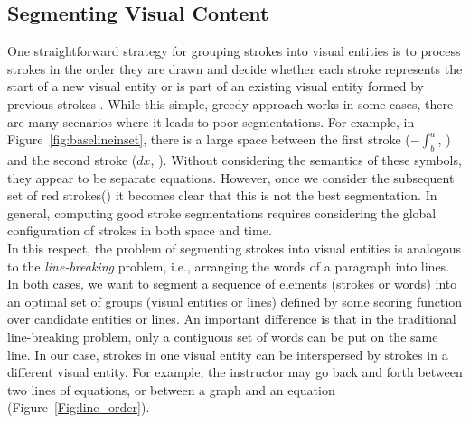 \subsection{Segmenting Visual Content}
\label{sec:segmentation}
One straightforward strategy for grouping strokes into visual entities
is to process strokes in the order they are drawn and decide whether
each stroke represents the start of a new visual entity or is part of
an existing visual entity formed by previous strokes \cite{mynatt1999flatland}.
While this simple, greedy approach works in some cases, there are many
scenarios where it leads to poor segmentations. 
For example, in
Figure~\ref{fig:baselineinset}, there is a large space between the first stroke ($-\int^a_b$, ) and the second stroke ($dx$, ). Without considering the semantics of these symbols, 
they appear to be separate equations. However, once we consider 
the subsequent set of red strokes()
 it becomes clear that this is not the best segmentation. In general, computing good stroke segmentations requires considering
the global configuration of strokes in both space and time. \\

In this respect, the problem of segmenting strokes into visual
entities is analogous to the
\emph{line-breaking} problem, i.e., arranging the words of a paragraph
into lines.  In both cases, we want to segment a sequence of elements
(strokes or words) into an optimal set of groups (visual entities or
lines) defined by some scoring function over candidate entities or lines.
An important difference is that in the traditional line-breaking problem, only a
contiguous set of words can be put on the same line. In our case,
strokes in one visual entity can be interspersed by strokes in a
different visual entity. For example, the instructor may
go back and forth between two lines of equations, or
between a graph and an equation (Figure~\ref{Fig:line_order}).\\

